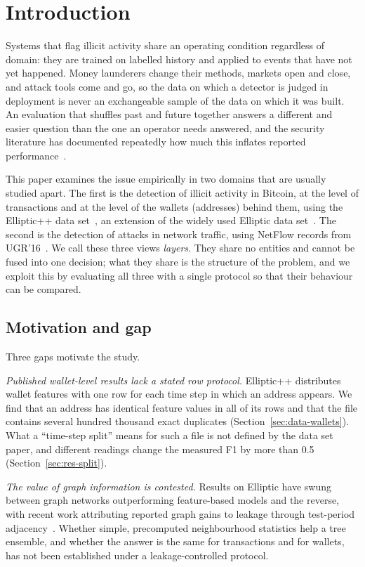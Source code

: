\section{Introduction}\label{sec:intro}

Systems that flag illicit activity share an operating condition regardless of domain: they are trained on labelled history and applied to events that have not yet happened. Money launderers change their methods, markets open and close, and attack tools come and go, so the data on which a detector is judged in deployment is never an exchangeable sample of the data on which it was built. An evaluation that shuffles past and future together answers a different and easier question than the one an operator needs answered, and the security literature has documented repeatedly how much this inflates reported performance~\cite{pendlebury2019,arp2022,kapoor2023}.

This paper examines the issue empirically in two domains that are usually studied apart. The first is the detection of illicit activity in Bitcoin, at the level of transactions and at the level of the wallets (addresses) behind them, using the Elliptic++ data set~\cite{elmougy2023}, an extension of the widely used Elliptic data set~\cite{weber2019}. The second is the detection of attacks in network traffic, using NetFlow records from UGR'16~\cite{macia2018}. We call these three views \emph{layers}. They share no entities and cannot be fused into one decision; what they share is the structure of the problem, and we exploit this by evaluating all three with a single protocol so that their behaviour can be compared.

\subsection{Motivation and gap}
Three gaps motivate the study.

\emph{Published wallet-level results lack a stated row protocol.} Elliptic++ distributes wallet features with one row for each time step in which an address appears. We find that an address has identical feature values in all of its rows and that the file contains several hundred thousand exact duplicates (Section~\ref{sec:data-wallets}). What a ``time-step split'' means for such a file is not defined by the data set paper, and different readings change the measured F1 by more than 0.5 (Section~\ref{sec:res-split}).

\emph{The value of graph information is contested.} Results on Elliptic have swung between graph networks outperforming feature-based models and the reverse, with recent work attributing reported graph gains to leakage through test-period adjacency~\cite{maganti2026}. Whether simple, precomputed neighbourhood statistics help a tree ensemble, and whether the answer is the same for transactions and for wallets, has not been established under a leakage-controlled protocol.

